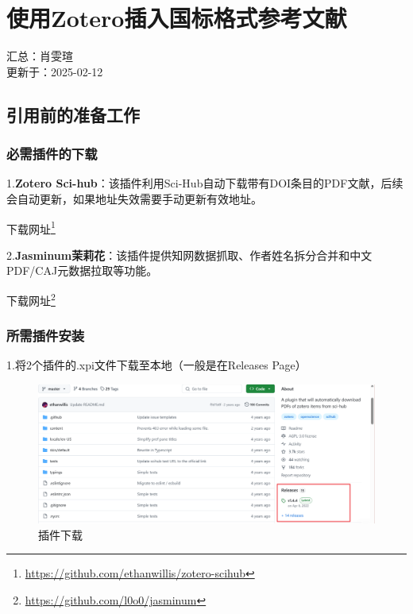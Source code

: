 \documentclass[]{ctexbook}
\renewcommand{\href}[2]{#2\footnote{\url{#1}}}
\theoremstyle{definition}
\theoremstyle{definition}
\theoremstyle{definition}
\theoremstyle{definition}
\theoremstyle{remark}
\begin{document}
\chapter{使用Zotero插入国标格式参考文献}\label{zotero-cite-cn}

汇总：肖雯瑄\\
更新于：2025-02-12

\section{引用前的准备工作}\label{ux5f15ux7528ux524dux7684ux51c6ux5907ux5de5ux4f5c}

\subsection{必需插件的下载}\label{ux5fc5ux9700ux63d2ux4ef6ux7684ux4e0bux8f7d}

1.\textbf{Zotero Sci-hub}：该插件利用Sci-Hub自动下载带有DOI条目的PDF文献，后续会自动更新，如果地址失效需要手动更新有效地址。

\href{https://github.com/ethanwillis/zotero-scihub}{下载网址}

2.\textbf{Jasminum茉莉花}：该插件提供知网数据抓取、作者姓名拆分合并和中文PDF/CAJ元数据拉取等功能。

\href{https://github.com/l0o0/jasminum}{下载网址}

\subsection{所需插件安装}\label{ux6240ux9700ux63d2ux4ef6ux5b89ux88c5}

1.将2个插件的.xpi文件下载至本地（一般是在Releases Page）

\begin{figure}

{\centering \includegraphics[width=1\linewidth]{img/zotero-cite-cn/plugins_download} 

}

\caption{插件下载}\label{fig:plugins-download}
\end{figure}
\end{document}
